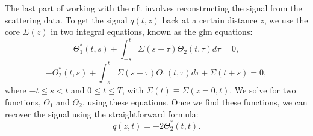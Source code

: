 The last part of working with the \gls{nft} involves reconstructing the signal from the scattering data. To get the signal \( q(t, z) \) back at a certain distance \( z \), we use the core \( \Sigma (z) \) in two integral equations, known as the \acrfull{glm} equations:
\begin{equation}
    \Theta_1^{*}(t,s)+\int_{-s}^{t} \Sigma(s+\tau) \Theta_2(t,\tau) d\tau = 0,
    \label{eq:glm_1}
\end{equation}
\begin{equation}
    -\Theta_2^{*}(t,s)+\int_{-s}^{t} \Sigma(s+\tau) \Theta_1(t,\tau) d\tau + \Sigma(t+s) = 0,
    \label{eq:glm_2}
\end{equation}
where \( -t \le s < t \) and \( 0 \le t \le T \), with $ \Sigma (t) \equiv \Sigma (z = 0, t) $. We solve for two functions, \( \Theta_1 \) and \( \Theta_2 \), using these equations. Once we find these functions, we can recover the signal using the straightforward formula:
\begin{equation}
    q(z,t) = -2 \Theta_2^{*}(t,t).
    \label{eq:glm_q}
\end{equation}






